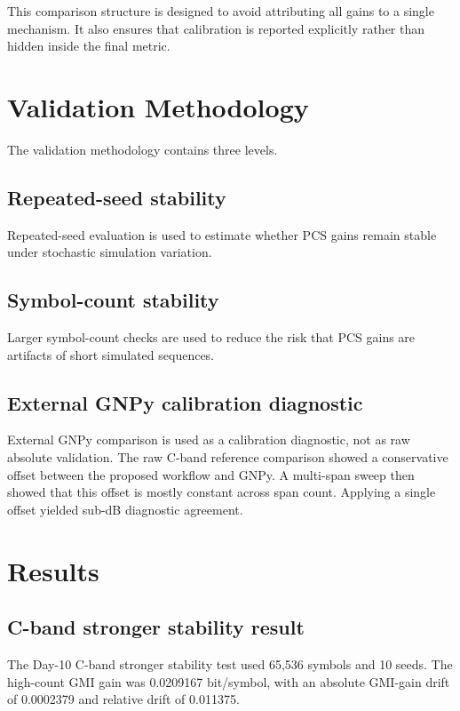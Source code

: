 ﻿\documentclass[pdflatex,sn-mathphys-num]{sn-jnl}
\begin{document}
This comparison structure is designed to avoid attributing all gains to a single mechanism. It also ensures that calibration is reported explicitly rather than hidden inside the final metric.

\section{Validation Methodology}

The validation methodology contains three levels.

\subsection{Repeated-seed stability}

Repeated-seed evaluation is used to estimate whether PCS gains remain stable under stochastic simulation variation.

\subsection{Symbol-count stability}

Larger symbol-count checks are used to reduce the risk that PCS gains are artifacts of short simulated sequences.

\subsection{External GNPy calibration diagnostic}

External GNPy comparison is used as a calibration diagnostic, not as raw absolute validation. The raw C-band reference comparison showed a conservative offset between the proposed workflow and GNPy. A multi-span sweep then showed that this offset is mostly constant across span count. Applying a single offset yielded sub-dB diagnostic agreement.

\section{Results}

\subsection{C-band stronger stability result}

The Day-10 C-band stronger stability test used 65,536 symbols and 10 seeds. The high-count GMI gain was 0.0209167 bit/symbol, with an absolute GMI-gain drift of 0.0002379 and relative drift of 0.011375.
\end{document}
